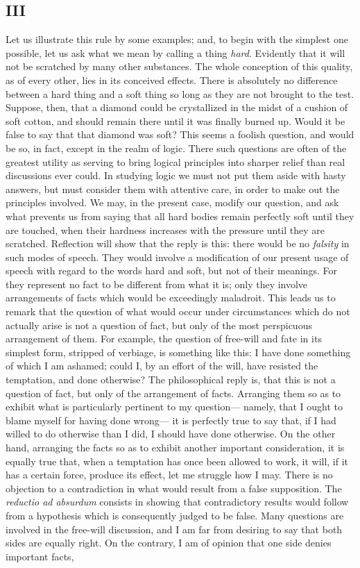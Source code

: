 \documentclass[]{article}
\begin{document}
\subsection*{III}

Let us illustrate this rule by some examples; and, to begin with the simplest one possible, let us ask what we mean by calling a thing \emph{hard}. Evidently that it will not be scratched by many other substances. The whole conception of this quality, as of every other, lies in its conceived effects. There is absolutely no difference between a hard thing and a soft thing so long as they are not brought to the test. Suppose, then, that a diamond could be crystallized in the midst of a cushion of soft cotton, and should remain there until it was finally burned up. Would it be false to say that that diamond was soft? This seems a foolish question, and would be so, in fact, except in the realm of logic. There such questions are often of the greatest utility as serving to bring logical principles into sharper relief than real discussions ever could. In studying logic we must not put them aside with hasty answers, but must consider them with attentive care, in order  to make out the principles involved. We may, in the present case, modify our question, and ask what prevents us from saying that all hard bodies remain perfectly soft until they are touched, when their hardness increases with the pressure until they are scratched. Reflection will show that the reply is this: there would be no \emph{falsity} in such modes of speech. They would involve a modification of our present usage of speech with regard to the words hard and soft, but not of their meanings. For they represent no fact to be different from what it is; only they involve arrangements of facts which would be exceedingly maladroit. This leads us to remark that the question of what would occur under circumstances which do not actually arise is not a question of fact, but only of the most perspicuous arrangement of them. For example, the question of free-will and fate in its simplest form, stripped of verbiage, is something like this: I have done something of which I am ashamed; could I, by an effort of the will, have resisted the temptation, and done otherwise? The philosophical reply is, that this is not a question of fact, but only of the arrangement of facts. Arranging them so as to exhibit what is particularly pertinent to my question--- namely, that I ought to blame myself for having done wrong--- it is perfectly true to say that, if I had willed to do otherwise than I did, I should have done otherwise. On the other hand, arranging the facts so as to exhibit another important consideration, it is equally true that, when a temptation has once been allowed to work, it will, if it has a certain force, produce its effect, let me struggle how I may. There is no objection to a contradiction in what would result from a false supposition. The \emph{reductio ad absurdum} consists in showing that contradictory results would follow from a hypothesis which is consequently judged to be false. Many questions are involved in the free-will discussion, and I am far from desiring to say that both sides are equally right. On the contrary, I am of opinion that one side denies important facts, 
\end{document}
